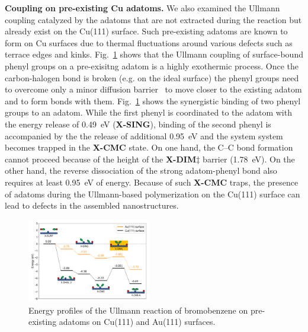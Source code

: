 \documentclass[aps,prb,amsmath,amssymb,11pt]{revtex4-1}
\newcommand{\zhzh}{\color{blue}}
\newcommand{\zhzh}{\color{blue}}
\begin{document}
\textbf{Coupling on pre-existing Cu adatoms.} We also examined the Ullmann coupling catalyzed by the adatoms that are not extracted during the reaction but already exist on the Cu(111) surface. Such pre-existing adatoms are known to form on Cu surfaces due to thermal fluctuations around various defects such as terrace edges and kinks. 
Fig.~\ref{fig:adatomullmann} shows that the Ullmann coupling of surface-bound phenyl groups on a pre-exisitng adatom is a highly exothermic process. Once the carbon-halogen bond is broken (e.g. on the ideal surface) the phenyl groups need to overcome only a minor diffusion barrier~\cite{pccp2010} to move closer to the existing adatom and to form bonds with them. 
Fig.~\ref{fig:adatomullmann} shows the synergistic binding of two phenyl groups to an adatom. While the first phenyl is coordinated to the adatom with the energy release of \SI{0.49}{\electronvolt} {\zhzh (\textbf{X-SING})}, binding of the second phenyl is accompanied by the the release of additional \SI{0.95}{\electronvolt} and the system system becomes trapped in the \textbf{X-CMC} state. On one hand, the C--C bond formation cannot proceed because of the height of the \textbf{X-DIM$\ddagger$} barrier {\zhzh (\SI{1.78}{\electronvolt})}. On the other hand, the reverse dissociation of the strong adatom-phenyl bond also requires at least \SI{0.95}{\electronvolt} of energy. 
Because of such \textbf{X-CMC} traps, the presence of adatoms during the Ullmann-based polymerization on the Cu(111) surface can lead to defects in the assembled nanostructures.

\begin{figure}[bt]
\centering
\includegraphics[width=0.48\textwidth]{Fig/ullmann_adatom.pdf}
\caption{Energy profiles of the Ullmann reaction of bromobenzene on pre-existing adatoms on Cu(111) and Au(111) surfaces.}
\label{fig:adatomullmann}
\end{figure}
\end{document}
